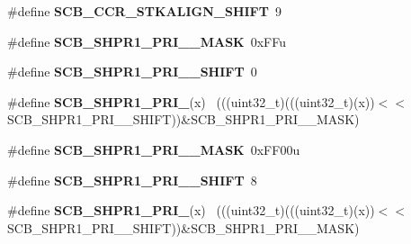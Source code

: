\begin{DoxyCompactItemize}
\item 
\hypertarget{group___s_c_b___register___masks_ga217ffb9b976391961423e4a0802fbe66}{}\#define {\bfseries S\+C\+B\+\_\+\+C\+C\+R\+\_\+\+S\+T\+K\+A\+L\+I\+G\+N\+\_\+\+S\+H\+I\+F\+T}~9\label{group___s_c_b___register___masks_ga217ffb9b976391961423e4a0802fbe66}

\item 
\hypertarget{group___s_c_b___register___masks_gae52165efebcbdb71cc8713d30699ad47}{}\#define {\bfseries S\+C\+B\+\_\+\+S\+H\+P\+R1\+\_\+\+P\+R\+I\+\_\+\_\+\+M\+A\+S\+K}~0x\+F\+Fu\label{group___s_c_b___register___masks_gae52165efebcbdb71cc8713d30699ad47}

\item 
\hypertarget{group___s_c_b___register___masks_ga5ef73a44ce4224e83d5572918846a5bd}{}\#define {\bfseries S\+C\+B\+\_\+\+S\+H\+P\+R1\+\_\+\+P\+R\+I\+\_\+\_\+\+S\+H\+I\+F\+T}~0\label{group___s_c_b___register___masks_ga5ef73a44ce4224e83d5572918846a5bd}

\item 
\hypertarget{group___s_c_b___register___masks_ga4ef7038de312ef767cb713ad1d66124d}{}\#define {\bfseries S\+C\+B\+\_\+\+S\+H\+P\+R1\+\_\+\+P\+R\+I\+\_}(x)                                          ~(((uint32\+\_\+t)(((uint32\+\_\+t)(x))$<$$<$S\+C\+B\+\_\+\+S\+H\+P\+R1\+\_\+\+P\+R\+I\+\_\+\_\+\+S\+H\+I\+F\+T))\&S\+C\+B\+\_\+\+S\+H\+P\+R1\+\_\+\+P\+R\+I\+\_\+\_\+\+M\+A\+S\+K)\label{group___s_c_b___register___masks_ga4ef7038de312ef767cb713ad1d66124d}

\item 
\hypertarget{group___s_c_b___register___masks_gae6540ba850a3a5e3a9d6f4c41589dc02}{}\#define {\bfseries S\+C\+B\+\_\+\+S\+H\+P\+R1\+\_\+\+P\+R\+I\+\_\+\_\+\+M\+A\+S\+K}~0x\+F\+F00u\label{group___s_c_b___register___masks_gae6540ba850a3a5e3a9d6f4c41589dc02}

\item 
\hypertarget{group___s_c_b___register___masks_ga0e84aa13b2569cf65afe8bdacda74219}{}\#define {\bfseries S\+C\+B\+\_\+\+S\+H\+P\+R1\+\_\+\+P\+R\+I\+\_\+\_\+\+S\+H\+I\+F\+T}~8\label{group___s_c_b___register___masks_ga0e84aa13b2569cf65afe8bdacda74219}

\item 
\hypertarget{group___s_c_b___register___masks_ga126794030c25da1900bdacb7251f95a4}{}\#define {\bfseries S\+C\+B\+\_\+\+S\+H\+P\+R1\+\_\+\+P\+R\+I\+\_}(x)                                          ~(((uint32\+\_\+t)(((uint32\+\_\+t)(x))$<$$<$S\+C\+B\+\_\+\+S\+H\+P\+R1\+\_\+\+P\+R\+I\+\_\+\_\+\+S\+H\+I\+F\+T))\&S\+C\+B\+\_\+\+S\+H\+P\+R1\+\_\+\+P\+R\+I\+\_\+\_\+\+M\+A\+S\+K)\label{group___s_c_b___register___masks_ga126794030c25da1900bdacb7251f95a4}


\end{DoxyCompactItemize}
